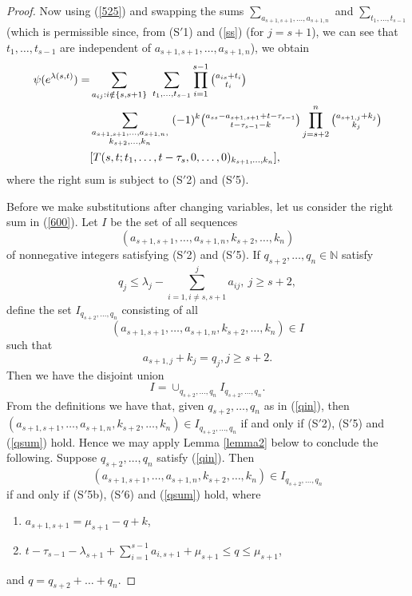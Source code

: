 \documentclass[ALCO,Unicode]{cedram}
\numberwithin{equation}{section}
\begin{document}
\begin{proof}
Now using (\ref{525}) and swapping the sums $\sum_{a_{s+1,s+1},\dots,a_{s+1,n}}$ and  $\sum_{t_1,\dots,t_{s-1}}$ (which is permissible since, from (S$'$1) and (\ref{ss}) (for $j=s+1$), we can see that $t_1,\dots,t_{s-1}$ are independent of $a_{s+1,s+1},\dots,a_{s+1,n}$), we obtain
	\begin{align}\label{600}
	\psi(e^{\lambda(s,t)})= 	&\sum_{a_{ij}: i \notin \{s, s+1\}} \  \sum_{t_1,\dots,t_{s-1}}\prod_{i=1}^{s-1}\tbinom{a_{is}+t_i}{t_i} \\ \nonumber & \sum_{\substack {a_{s+1,s+1},\dots,a_{s+1,n}, \\ k_{s+2},\dots,k_n }  } \   (-1)^k \tbinom{a_{ss}-a_{s+1,s+1}+t-\tau_{s-1}}{t-\tau_{s-1}-k}\prod_{j=s+2}^{n}\tbinom{a_{s+1,j}+k_{j}}{k_{j}} \\\nonumber& [T(s,t;t_1,\dots,t-\tau_s,0,\dots,0)_{k_{s+1},\dots,k_n}], \end{align}
	where the right sum is subject to (S$'$2) and (S$'$5). 
	
	Before we make substitutions after changing variables, let us consider the right sum in (\ref{600}). Let $I$ be the set of all sequences \[(a_{s+1,s+1},\dots,a_{s+1,n},k_{s+2},\dots,k_{n})\] of nonnegative integers satisfying (S$'$2) and (S$'$5). If $q_{s+2},\ldots,q_n \in \mathbb{N}$ satisfy \begin{equation}\label{qin}q_j \le \lambda_j - \sum_{i=1, i \neq s,s+1}^{j}a_{ij}, \  j \ge s+2,\end{equation}
	define the set $I_{q_{s+2},\dots,q_n}$ consisting of all \[(a_{s+1,s+1},\dots,a_{s+1,n},k_{s+2},\dots,k_{n}) \in I\] such that \begin{equation}\label{qsum}a_{s+1,j}+k_j=q_j, j \ge s+2.\end{equation} Then we have the disjoint union \[I= \cup_{q_{s+2},\dots,q_n}I_{q_{s+2},\dots,q_n}.\] From the definitions we have that, given $q_{s+2},\dots,q_n$ as in (\ref{qin}), then\\ $(a_{s+1,s+1},\dots,a_{s+1,n},k_{s+2},\dots,k_{n}) \in I_{q_{s+2},\dots,q_n}$ if and only if (S$'$2), (S$'$5) and (\ref{qsum}) hold. Hence we may apply Lemma \ref{lemma2} below to conclude the following. Suppose $q_{s+2},\dots,q_n$ satisfy (\ref{qin}). Then 
		\[(a_{s+1,s+1},\dots,a_{s+1,n},k_{s+2},\dots,k_{n}) \in I_{q_{s+2},\dots,q_n}\] if and only if (S$'$5b), (S$'$6) and (\ref{qsum}) hold, where
	\begin{enumerate}
		\item[(S$'$6a)]$a_{s+1,s+1}=\mu_{s+1}-q+k$,
		\item[(S$'$6b)]$t-\tau_{s-1}-\lambda_{s+1}+\sum_{i=1}^{s-1}a_{i,s+1}+\mu_{s+1} \le q \le \mu_{s+1}$,
	\end{enumerate}
	and $q=q_{s+2}+\dots+q_n$.
	

\end{proof}
\end{document}
